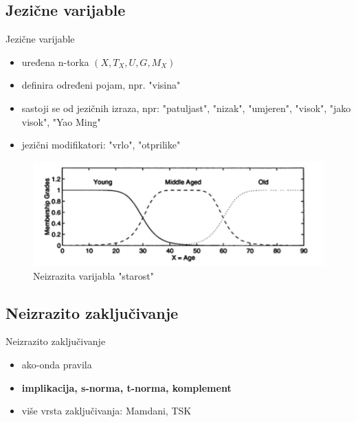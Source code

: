 \documentclass{beamer}
\begin{document}
\subsection{Jezične varijable}

\begin{frame}{Jezične varijable}
\begin{itemize}
  \item uređena n-torka $(X, T_X, U, G, M_X)$
  \item definira određeni pojam, npr. "visina"
  \item sastoji se od jezičnih izraza, npr: "patuljast", "nizak", "umjeren", "visok", "jako visok", "Yao Ming"
  \item jezični modifikatori: "vrlo", "otprilike"
\end{itemize}
\end{frame}

\begin{frame}{}
\begin{figure}[h]
  \includegraphics[width=\textwidth]{img/fuzzy_var.PNG}
  \caption{Neizrazita varijabla "starost"}
\end{figure}
\end{frame}

\subsection{Neizrazito zaključivanje}
\begin{frame}{Neizrazito zaključivanje}

\begin{itemize}
  \item ako-onda pravila
  \item \textbf{implikacija, s-norma, t-norma, komplement}
  \item više vrsta zaključivanja: Mamdani, TSK
\end{itemize}
\end{frame}
\end{document}
